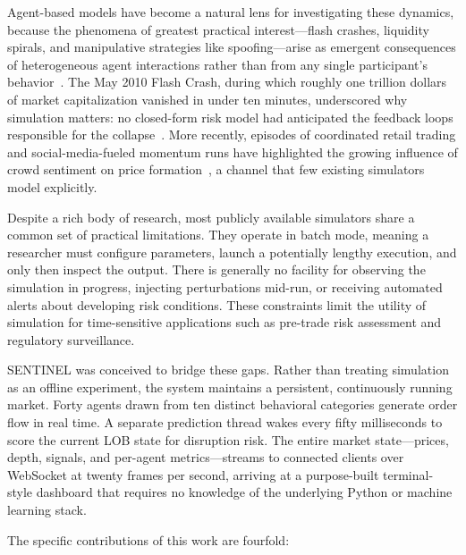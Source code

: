 \documentclass[conference]{IEEEtran}
\begin{document}
Agent-based models have become a natural lens for investigating these
dynamics, because the phenomena of greatest practical interest---flash
crashes, liquidity spirals, and manipulative strategies like
spoofing---arise as emergent consequences of heterogeneous agent
interactions rather than from any single participant's
behavior~\cite{ref6}. The May 2010 Flash Crash, during which roughly
one trillion dollars of market capitalization vanished in under ten
minutes, underscored why simulation matters: no closed-form risk model
had anticipated the feedback loops responsible for the
collapse~\cite{ref5}\cite{ref11}. More recently, episodes of
coordinated retail trading and social-media-fueled momentum runs have
highlighted the growing influence of crowd sentiment on price
formation~\cite{ref14}\cite{ref15}, a channel that few existing
simulators model explicitly.

Despite a rich body of research, most publicly available simulators
share a common set of practical limitations. They operate in batch
mode, meaning a researcher must configure parameters, launch a
potentially lengthy execution, and only then inspect the output.
There is generally no facility for observing the simulation in
progress, injecting perturbations mid-run, or receiving automated
alerts about developing risk conditions. These constraints limit the
utility of simulation for time-sensitive applications such as
pre-trade risk assessment and regulatory surveillance.

SENTINEL was conceived to bridge these gaps. Rather than treating
simulation as an offline experiment, the system maintains a
persistent, continuously running market. Forty agents drawn from ten
distinct behavioral categories generate order flow in real time. A
separate prediction thread wakes every fifty milliseconds to score
the current LOB state for disruption risk. The entire market
state---prices, depth, signals, and per-agent metrics---streams to
connected clients over WebSocket at twenty frames per second, arriving
at a purpose-built terminal-style dashboard that requires no knowledge
of the underlying Python or machine learning stack.

The specific contributions of this work are fourfold:
\end{document}
